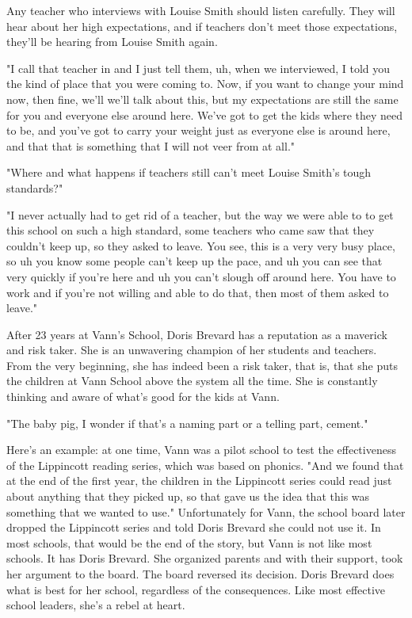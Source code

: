Any teacher who interviews with Louise Smith should listen carefully.
They will hear about her high expectations, and if teachers don't meet those expectations, they'll be hearing from Louise Smith again.

"I call that teacher in and I just tell them, uh, when we interviewed, I told you the kind of place that you were coming to.
Now, if you want to change your mind now, then fine, we'll we'll talk about this, but my expectations are still the same for you and everyone else around here.
We've got to get the kids where they need to be, and you've got to carry your weight just as everyone else is around here, and that that is something that I will not veer from at all."

"Where and what happens if teachers still can't meet Louise Smith's tough standards?"

"I never actually had to get rid of a teacher, but the way we were able to to get this school on such a high standard, some teachers who came saw that they couldn't keep up, so they asked to leave.
You see, this is a very very busy place, so uh you know some people can't keep up the pace, and uh you can see that very quickly if you're here and uh you can't slough off around here.
You have to work and if you're not willing and able to do that, then most of them asked to leave."

After 23 years at Vann's School, Doris Brevard has a reputation as a maverick and risk taker.
She is an unwavering champion of her students and teachers.
From the very beginning, she has indeed been a risk taker, that is, that she puts the children at Vann School above the system all the time.
She is constantly thinking and aware of what's good for the kids at Vann.

"The baby pig, I wonder if that's a naming part or a telling part, cement."

Here's an example: at one time, Vann was a pilot school to test the effectiveness of the Lippincott reading series, which was based on phonics.
"And we found that at the end of the first year, the children in the Lippincott series could read just about anything that they picked up, so that gave us the idea that this was something that we wanted to use." Unfortunately for Vann, the school board later dropped the Lippincott series and told Doris Brevard she could not use it.
In most schools, that would be the end of the story, but Vann is not like most schools.
It has Doris Brevard.
She organized parents and with their support, took her argument to the board.
The board reversed its decision.
Doris Brevard does what is best for her school, regardless of the consequences.
Like most effective school leaders, she's a rebel at heart.

